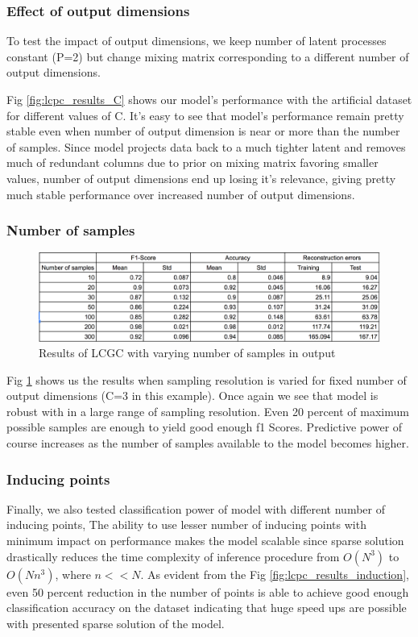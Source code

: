 \subsubsection{Effect of output dimensions}
To test the impact of output dimensions, we keep number of latent processes constant (P=2) but change mixing matrix corresponding to a different number of output dimensions. 

Fig \ref{fig:lcpc_results_C} shows our model’s performance with the artificial dataset for different values of C. It’s easy to see that model's performance remain pretty stable even when number of output dimension is near or more than the number of samples. Since model projects data back to a much tighter latent and removes much of redundant columns due to prior on mixing matrix favoring smaller values, number of output dimensions end up losing it's relevance, giving pretty much stable performance over increased number of output dimensions.
\subsubsection{Number of samples}
\begin{figure}
    \centering
    \includegraphics[scale=0.35]{thesis/images/LCGC_samples_results.png}
    \caption{Results of LCGC with varying number of samples in output}
    \label{fig:lcpc_results_samples}
\end{figure}

Fig \ref{fig:lcpc_results_samples} shows us the results when sampling resolution is varied for fixed number of output dimensions (C=3 in this example). Once again we see that model is robust with in a large range of sampling resolution. Even 20 percent of maximum possible samples are enough to yield good enough f1 Scores. Predictive power of course increases as the number of samples available to the model becomes higher.

\subsubsection{Inducing points}
Finally, we also tested classification power of model with different number of inducing points, The ability to use lesser number of inducing points with minimum impact on performance makes the model scalable since sparse solution drastically reduces the time complexity of inference procedure from $O(N^3)$ to $O(Nn^3)$, where $n << N$. 
As evident from the Fig \ref{fig:lcpc_results_induction}, even 50 percent reduction in the number of points is able to achieve good enough classification accuracy on the dataset indicating that huge speed ups are possible with  presented sparse solution of the model.

